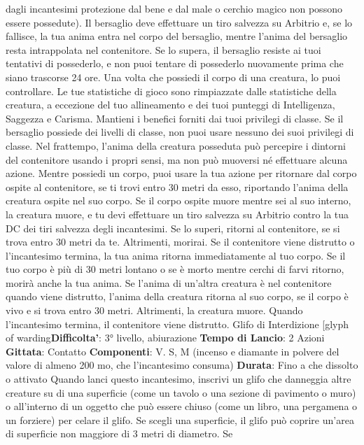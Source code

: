 \begin{multicols}{2}
dagli incantesimi protezione dal bene e dal male o
cerchio magico non possono essere possedute). Il
bersaglio deve effettuare un tiro salvezza su Arbitrio e,
se lo fallisce, la tua anima entra nel corpo del bersaglio,
mentre l’anima del bersaglio resta intrappolata nel
contenitore. Se lo supera, il bersaglio resiste ai tuoi
tentativi di possederlo, e non puoi tentare di possederlo
nuovamente prima che siano trascorse 24 ore.
Una volta che possiedi il corpo di una creatura, lo puoi
controllare. Le tue statistiche di gioco sono rimpiazzate
dalle statistiche della creatura, a eccezione del tuo
allineamento e dei tuoi punteggi di Intelligenza,
Saggezza e Carisma. Mantieni i benefici forniti dai tuoi
privilegi di classe. Se il bersaglio possiede dei livelli di
classe, non puoi usare nessuno dei suoi privilegi di
classe.
Nel frattempo, l’anima della creatura posseduta può
percepire i dintorni del contenitore usando i propri
sensi, ma non può muoversi né effettuare alcuna
azione.
Mentre possiedi un corpo, puoi usare la tua azione per
ritornare dal corpo ospite al contenitore, se ti trovi entro
30 metri da esso, riportando l’anima della creatura
ospite nel suo corpo. Se il corpo ospite muore mentre
sei al suo interno, la creatura muore, e tu devi effettuare
un tiro salvezza su Arbitrio contro la tua DC dei tiri
salvezza degli incantesimi. Se lo superi, ritorni al
contenitore, se si trova entro 30 metri da te. Altrimenti,
morirai.
Se il contenitore viene distrutto o l’incantesimo termina,
la tua anima ritorna immediatamente al tuo corpo. Se il
tuo corpo è più di 30 metri lontano o se è morto mentre
cerchi di farvi ritorno, morirà anche la tua anima. Se
l’anima di un’altra creatura è nel contenitore quando
viene distrutto, l’anima della creatura ritorna al suo
corpo, se il corpo è vivo e si trova entro 30 metri.
Altrimenti, la creatura muore.
Quando l’incantesimo termina, il contenitore viene
distrutto.
Glifo di Interdizione
[glyph of warding\textbf{Difficolta'}:
3° livello, abiurazione
\textbf{Tempo di Lancio}: 2 Azioni
\textbf{Gittata}: Contatto
\textbf{Componenti}: V. S, M (incenso e diamante in polvere
del valore di almeno 200 mo, che l’incantesimo
consuma)
\textbf{Durata}: Fino a che dissolto o attivato
Quando lanci questo incantesimo, inscrivi un glifo che
danneggia altre creature su di una superficie (come un
tavolo o una sezione di pavimento o muro) o all’interno
di un oggetto che può essere chiuso (come un libro,
una pergamena o un forziere) per celare il glifo. Se
scegli una superficie, il glifo può coprire un’area di
superficie non maggiore di 3 metri di diametro. Se

\end{multicols}
